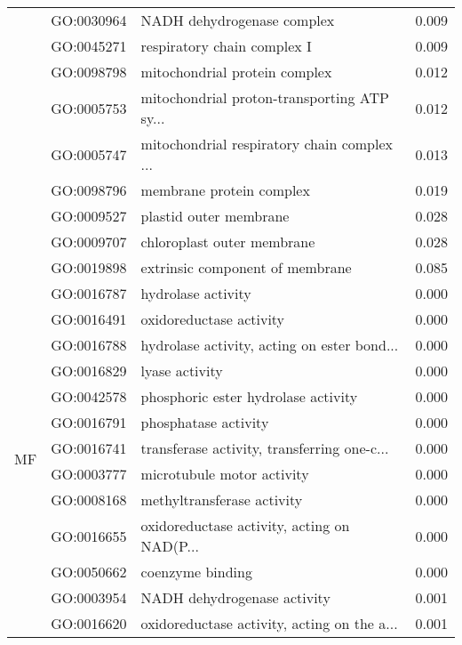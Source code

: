 \begin{longtable}{lllr}
   & GO:0030964 &                   NADH dehydrogenase complex &         0.009 \\
   & GO:0045271 &                  respiratory chain complex I &         0.009 \\
   & GO:0098798 &                mitochondrial protein complex &         0.012 \\
   & GO:0005753 &  mitochondrial proton-transporting ATP sy... &         0.012 \\
   & GO:0005747 &  mitochondrial respiratory chain complex ... &         0.013 \\
   & GO:0098796 &                     membrane protein complex &         0.019 \\
   & GO:0009527 &                       plastid outer membrane &         0.028 \\
   & GO:0009707 &                   chloroplast outer membrane &         0.028 \\
   & GO:0019898 &              extrinsic component of membrane &         0.085 \\
\cline{1-4}
\multirow{75}{*}{MF} & GO:0016787 &                           hydrolase activity &         0.000 \\
   & GO:0016491 &                      oxidoreductase activity &         0.000 \\
   & GO:0016788 &  hydrolase activity, acting on ester bond... &         0.000 \\
   & GO:0016829 &                               lyase activity &         0.000 \\
   & GO:0042578 &          phosphoric ester hydrolase activity &         0.000 \\
   & GO:0016791 &                         phosphatase activity &         0.000 \\
   & GO:0016741 &  transferase activity, transferring one-c... &         0.000 \\
   & GO:0003777 &                   microtubule motor activity &         0.000 \\
   & GO:0008168 &                   methyltransferase activity &         0.000 \\
   & GO:0016655 &  oxidoreductase activity, acting on NAD(P... &         0.000 \\
   & GO:0050662 &                             coenzyme binding &         0.000 \\
   & GO:0003954 &                  NADH dehydrogenase activity &         0.001 \\
   & GO:0016620 &  oxidoreductase activity, acting on the a... &         0.001 \\

\end{longtable}
